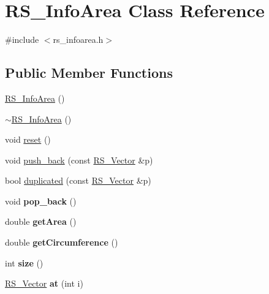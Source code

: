 \hypertarget{classRS__InfoArea}{\section{R\-S\-\_\-\-Info\-Area Class Reference}
\label{classRS__InfoArea}
}


{\ttfamily \#include $<$rs\-\_\-infoarea.\-h$>$}

\subsection*{Public Member Functions}
\begin{DoxyCompactItemize}
\item 
\hyperlink{classRS__InfoArea_a7891997030eacb8915f5bee9e790497a}{R\-S\-\_\-\-Info\-Area} ()
\item 
\hyperlink{classRS__InfoArea_a2d888f413fb9c2933f5ce43b6139c1a9}{$\sim$\-R\-S\-\_\-\-Info\-Area} ()
\item 
void \hyperlink{classRS__InfoArea_aa7644b2930d873be82bcca1eb106edba}{reset} ()
\item 
void \hyperlink{classRS__InfoArea_a6fd4af7aa005ded04ad76121c83d5583}{push\-\_\-back} (const \hyperlink{classRS__Vector}{R\-S\-\_\-\-Vector} \&p)
\item 
bool \hyperlink{classRS__InfoArea_a2ad42f28e7d99e791545d1b537bcc077}{duplicated} (const \hyperlink{classRS__Vector}{R\-S\-\_\-\-Vector} \&p)
\item 
\hypertarget{classRS__InfoArea_a28648d32f1d27c7e312ab3dee64e0a0e}{void {\bfseries pop\-\_\-back} ()}\label{classRS__InfoArea_a28648d32f1d27c7e312ab3dee64e0a0e}

\item 
\hypertarget{classRS__InfoArea_a033fd228b48159c16e0a8a255756385b}{double {\bfseries get\-Area} ()}\label{classRS__InfoArea_a033fd228b48159c16e0a8a255756385b}

\item 
\hypertarget{classRS__InfoArea_afee788740e92b6aba3381dba919b85c0}{double {\bfseries get\-Circumference} ()}\label{classRS__InfoArea_afee788740e92b6aba3381dba919b85c0}

\item 
\hypertarget{classRS__InfoArea_aea98ddbe88467454a70c51d67118bd61}{int {\bfseries size} ()}\label{classRS__InfoArea_aea98ddbe88467454a70c51d67118bd61}

\item 
\hypertarget{classRS__InfoArea_a306bcebbedb3b781f57aeb6836f8cb9c}{\hyperlink{classRS__Vector}{R\-S\-\_\-\-Vector} {\bfseries at} (int i)}\label{classRS__InfoArea_a306bcebbedb3b781f57aeb6836f8cb9c}

\end{DoxyCompactItemize}



